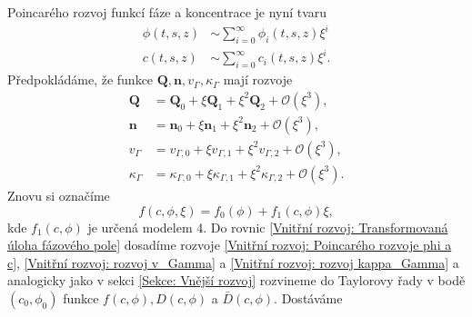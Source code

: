 Poincarého rozvoj funkcí fáze a koncentrace je nyní tvaru
\begin{subequations}\label{Vnitřní rozvoj: Poincarého rozvoje phi a c}
    \begin{align}
        \phi(t, s, z) &\sim \sum_{i=0}^\infty \phi_i(t, s, z)\xi^i\\
        c(t, s, z) &\sim \sum_{i=0}^\infty c_i(t, s, z)\xi^i.
    \end{align}
\end{subequations}
Předpokládáme, že funkce \(\mathbf{Q}, \mathbf{n}, v_\Gamma, \kappa_\Gamma\) mají rozvoje 
\begin{align}
\mathbf{Q} &= \mathbf{Q}_0 + \xi \mathbf{Q}_1 + \xi^2 \mathbf{Q}_2 + \mathcal{O}(\xi^3),\\
\mathbf{n} &= \mathbf{n}_0 + \xi \mathbf{n}_1 + \xi^2 \mathbf{n}_2 + \mathcal{O}(\xi^3),\\
v_\Gamma &= v_{\Gamma,0} + \xi v_{\Gamma, 1} + \xi^2 v_{\Gamma, 2} + \mathcal{O}(\xi^3),\label{Vnitřní rozvoj: rozvoj v_Gamma}\\
\kappa_\Gamma &= \kappa_{\Gamma,0} + \xi \kappa_{\Gamma, 1} + \xi^2 \kappa_{\Gamma, 2} + \mathcal{O}(\xi^3)\label{Vnitřní rozvoj: rozvoj kappa_Gamma}.
\end{align}
Znovu si označíme
\begin{equation}
    f(c, \phi, \xi) = f_0(\phi) + f_1(c, \phi) \xi,
\end{equation}
kde \(f_1(c, \phi)\) je určená modelem 4.
Do rovnic \eqref{Vnitřní rozvoj: Transformovaná úloha fázového pole} dosadíme rozvoje \eqref{Vnitřní rozvoj: Poincarého rozvoje phi a c}, \eqref{Vnitřní rozvoj: rozvoj v_Gamma} a \eqref{Vnitřní rozvoj: rozvoj kappa_Gamma} a analogicky jako v sekci \ref{Sekce: Vnější rozvoj} rozvineme do Taylorovy řady v bodě \((c_0, \phi_0)\) funkce \(f(c, \phi), D(c, \phi)\) a \(\bar D(c, \phi)\).
Dostáváme
